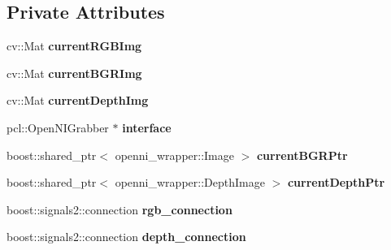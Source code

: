 \subsection*{Private Attributes}
\begin{DoxyCompactItemize}
\item 
\hypertarget{class_c_r_g_b_d_grabber_open_n_i___p_c_l_a3b538150b8b97ac77275d0e0cc782d2f}{
cv::Mat {\bfseries currentRGBImg}}
\label{class_c_r_g_b_d_grabber_open_n_i___p_c_l_a3b538150b8b97ac77275d0e0cc782d2f}

\item 
\hypertarget{class_c_r_g_b_d_grabber_open_n_i___p_c_l_a6fe0bee4cd42ccb07c3823461630acf7}{
cv::Mat {\bfseries currentBGRImg}}
\label{class_c_r_g_b_d_grabber_open_n_i___p_c_l_a6fe0bee4cd42ccb07c3823461630acf7}

\item 
\hypertarget{class_c_r_g_b_d_grabber_open_n_i___p_c_l_af6741aa6eea71dde6d8ab2ee9bffd849}{
cv::Mat {\bfseries currentDepthImg}}
\label{class_c_r_g_b_d_grabber_open_n_i___p_c_l_af6741aa6eea71dde6d8ab2ee9bffd849}

\item 
\hypertarget{class_c_r_g_b_d_grabber_open_n_i___p_c_l_a19dd8c4dbb891d9be9813c9e476a789c}{
pcl::OpenNIGrabber $\ast$ {\bfseries interface}}
\label{class_c_r_g_b_d_grabber_open_n_i___p_c_l_a19dd8c4dbb891d9be9813c9e476a789c}

\item 
\hypertarget{class_c_r_g_b_d_grabber_open_n_i___p_c_l_a102585f518935db8453e02ec7acaecb1}{
boost::shared\_\-ptr$<$ openni\_\-wrapper::Image $>$ {\bfseries currentBGRPtr}}
\label{class_c_r_g_b_d_grabber_open_n_i___p_c_l_a102585f518935db8453e02ec7acaecb1}

\item 
\hypertarget{class_c_r_g_b_d_grabber_open_n_i___p_c_l_ad723c92cb78a55c9d79c7f1449760a3f}{
boost::shared\_\-ptr$<$ openni\_\-wrapper::DepthImage $>$ {\bfseries currentDepthPtr}}
\label{class_c_r_g_b_d_grabber_open_n_i___p_c_l_ad723c92cb78a55c9d79c7f1449760a3f}

\item 
\hypertarget{class_c_r_g_b_d_grabber_open_n_i___p_c_l_a168e6d6a39f27cc55d37f4592d6e19f5}{
boost::signals2::connection {\bfseries rgb\_\-connection}}
\label{class_c_r_g_b_d_grabber_open_n_i___p_c_l_a168e6d6a39f27cc55d37f4592d6e19f5}

\item 
\hypertarget{class_c_r_g_b_d_grabber_open_n_i___p_c_l_a8c2e26b56e83fbc519e49a955fbb212a}{
boost::signals2::connection {\bfseries depth\_\-connection}}
\label{class_c_r_g_b_d_grabber_open_n_i___p_c_l_a8c2e26b56e83fbc519e49a955fbb212a}

\end{DoxyCompactItemize}


